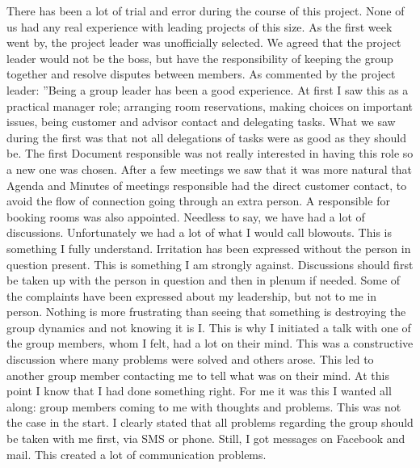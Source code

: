 There has been a lot of trial and error during the course of this project. None of us had any real experience with leading projects of this size. As the first week went by, the project leader was unofficially selected. We agreed that the project leader would not be the boss, but have the responsibility of keeping the group together and resolve disputes between members. As commented by the project leader:
\newline
\newline
''Being a group leader has been a good experience. At first I saw this as a practical manager role; arranging room reservations, making choices on important issues, being customer and advisor contact and delegating tasks.
\newline 
\newline
What we saw during the first was that not all delegations of tasks were as good as they should be. The first Document responsible was not really interested in having this role so a new one was chosen.
\newline 
\newline
After a few meetings we saw that it was more natural that Agenda and Minutes of meetings responsible had the direct customer contact, to avoid the flow of connection going through an extra person. A responsible for booking rooms was also appointed.
\newline
\newline
Needless to say, we have had a lot of discussions. Unfortunately we had a lot of what I would call blowouts. This is something I fully understand. Irritation has been expressed without the person in question present. This is something I am strongly against. Discussions should first be taken up with the person in question and then in plenum if needed.
\newline
\newline
Some of the complaints have been expressed about my leadership, but not to me in person. Nothing is more frustrating than seeing that something is destroying the group dynamics and not knowing it is I. This is why I initiated a talk with one of the group members, whom I felt, had a lot on their mind. This was a constructive discussion where many problems were solved and others arose. This led to another group member contacting me to tell what was on their mind. At this point I know that I had done something right. For me it was this I wanted all along: group members coming to me with thoughts and problems. This was not the case in the start. I clearly stated that all problems regarding the group should be taken with me first, via SMS or phone. Still, I got messages on Facebook and mail. This created a lot of communication problems.
